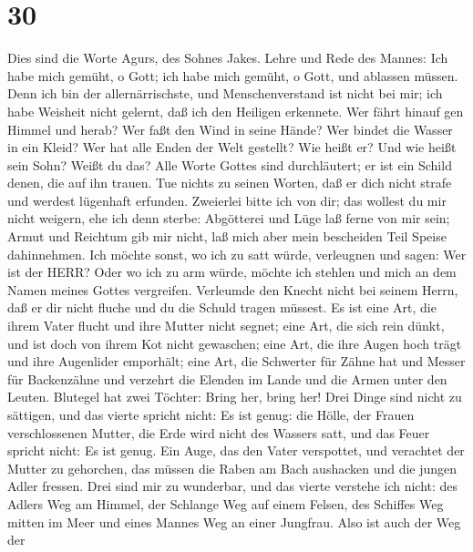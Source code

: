 \hypertarget{section-29}{%
\section{30}\label{section-29}}

 Dies sind die Worte Agurs, des Sohnes Jakes. Lehre und Rede
des Mannes: Ich habe mich gemüht, o Gott; ich habe mich gemüht, o Gott,
und ablassen müssen.  Denn ich bin der allernärrischste, und
Menschenverstand ist nicht bei mir;  ich habe Weisheit nicht
gelernt, daß ich den Heiligen erkennete.  Wer fährt hinauf
gen Himmel und herab? Wer faßt den Wind in seine Hände? Wer bindet die
Wasser in ein Kleid? Wer hat alle Enden der Welt gestellt? Wie heißt er?
Und wie heißt sein Sohn? Weißt du das?  Alle Worte Gottes
sind durchläutert; er ist ein Schild denen, die auf ihn trauen.
 Tue nichts zu seinen Worten, daß er dich nicht strafe und
werdest lügenhaft erfunden.  Zweierlei bitte ich von dir;
das wollest du mir nicht weigern, ehe ich denn sterbe: 
Abgötterei und Lüge laß ferne von mir sein; Armut und Reichtum gib mir
nicht, laß mich aber mein bescheiden Teil Speise dahinnehmen.
 Ich möchte sonst, wo ich zu satt würde, verleugnen und
sagen: Wer ist der HERR? Oder wo ich zu arm würde, möchte ich stehlen
und mich an dem Namen meines Gottes vergreifen.  Verleumde
den Knecht nicht bei seinem Herrn, daß er dir nicht fluche und du die
Schuld tragen müssest.  Es ist eine Art, die ihrem Vater
flucht und ihre Mutter nicht segnet;  eine Art, die sich
rein dünkt, und ist doch von ihrem Kot nicht gewaschen; 
eine Art, die ihre Augen hoch trägt und ihre Augenlider emporhält;
 eine Art, die Schwerter für Zähne hat und Messer für
Backenzähne und verzehrt die Elenden im Lande und die Armen unter den
Leuten.  Blutegel hat zwei Töchter: Bring her, bring her!
Drei Dinge sind nicht zu sättigen, und das vierte spricht nicht: Es ist
genug:  die Hölle, der Frauen verschlossenen Mutter, die
Erde wird nicht des Wassers satt, und das Feuer spricht nicht: Es ist
genug.  Ein Auge, das den Vater verspottet, und verachtet
der Mutter zu gehorchen, das müssen die Raben am Bach aushacken und die
jungen Adler fressen.  Drei sind mir zu wunderbar, und das
vierte verstehe ich nicht:  des Adlers Weg am Himmel, der
Schlange Weg auf einem Felsen, des Schiffes Weg mitten im Meer und eines
Mannes Weg an einer Jungfrau.  Also ist auch der Weg der
